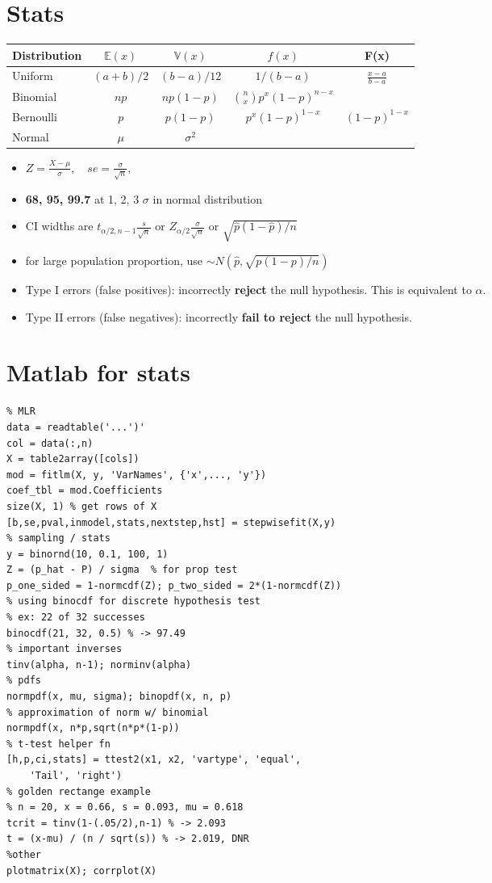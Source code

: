\documentclass{article}
\begin{document}
\begin{multicols*}{2}

\scriptsize
\section{Stats}

\def\arraystretch{1.2}
\begin{tabular}{ l c c c c }
    Distribution & $\mathbb{E}(x)$ & $\mathbb{V}(x)$ & $f(x)$ & F(x)  \\
    \hline
    Uniform & $(a+b)/2$ & $(b-a)/12$ & $1/(b-a)$ & $\frac{x-a}{b-a}$\\ 
    Binomial & $np$  & $np(1-p)$ & $\binom{n}{x}p^x(1-p)^{n-x}$ &  \\  
    Bernoulli & $p$ & $p(1-p)$ & $ p^x(1-p)^{1-x}$ & $(1-p)^{1-x}$ \\
    Normal & $\mu$ & $\sigma^2$ & &
\end{tabular}
\begin{itemize}
    \setlength\itemsep{0em}
    \item $Z = \frac{X-\mu}{\sigma}, \quad se = \frac{\sigma}{\sqrt{n}}, \quad $
    \item \textbf{68, 95, 99.7} at 1, 2, 3 $\sigma$ in normal distribution
    \item CI widths are $t_{\alpha/2, n-1}\frac{s}{\sqrt{n}}$ or $Z_{\alpha/2}\frac{\sigma}{\sqrt{n}}$ or $\sqrt{\hat{p}(1-\hat{p})/n}$
    \item for large population proportion, use $\sim N(\hat{p}, \sqrt{p(1-p)/n})$
    \item Type I errors (false positives): incorrectly  \textbf{reject} the null hypothesis. This is equivalent to $\alpha$.
    \item Type II errors (false negatives): incorrectly \textbf{fail to reject} the null hypothesis.
\end{itemize}

\section{Matlab for stats}
\begin{lstlisting}
% MLR
data = readtable('...')'
col = data(:,n)
X = table2array([cols])
mod = fitlm(X, y, 'VarNames', {'x',..., 'y'})
coef_tbl = mod.Coefficients
size(X, 1) % get rows of X
[b,se,pval,inmodel,stats,nextstep,hst] = stepwisefit(X,y)
% sampling / stats
y = binornd(10, 0.1, 100, 1)
Z = (p_hat - P) / sigma  % for prop test
p_one_sided = 1-normcdf(Z); p_two_sided = 2*(1-normcdf(Z))
% using binocdf for discrete hypothesis test
% ex: 22 of 32 successes
binocdf(21, 32, 0.5) % -> 97.49
% important inverses
tinv(alpha, n-1); norminv(alpha)
% pdfs
normpdf(x, mu, sigma); binopdf(x, n, p)
% approximation of norm w/ binomial
normpdf(x, n*p,sqrt(n*p*(1-p))
% t-test helper fn
[h,p,ci,stats] = ttest2(x1, x2, 'vartype', 'equal',
    'Tail', 'right')
% golden rectange example
% n = 20, x = 0.66, s = 0.093, mu = 0.618
tcrit = tinv(1-(.05/2),n-1) % -> 2.093
t = (x-mu) / (n / sqrt(s)) % -> 2.019, DNR
%other
plotmatrix(X); corrplot(X)
\end{lstlisting}



\end{multicols*}
\end{document}
